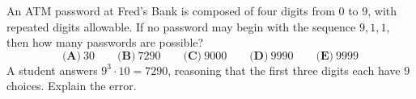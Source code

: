 An ATM password at Fred's Bank is composed of four digits from $0$ to $9$, with repeated digits allowable. If no password may begin with the sequence $9,1,1$, then how many passwords are possible?
\[
\textbf{(A)}\ 30\qquad\textbf{(B)}\ 7290\qquad\textbf{(C)}\ 9000\qquad\textbf{(D)}\ 9990\qquad\textbf{(E)}\ 9999
\]
A student answers $9^3\cdot10=7290$, reasoning that the first three digits each have $9$ choices. Explain the error.

